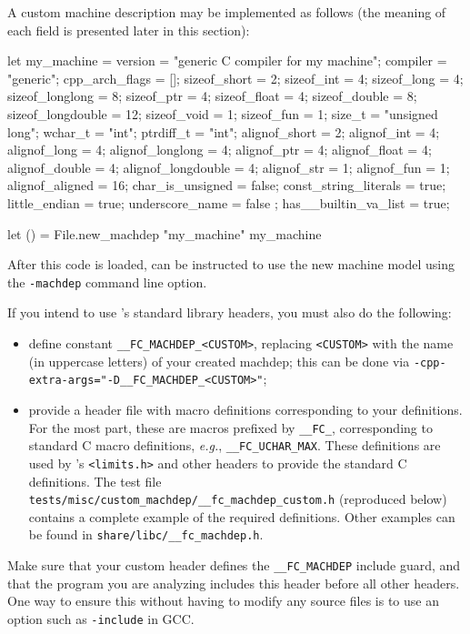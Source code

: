 \begin{example}
  A custom machine description may be implemented as follows
  (the meaning of each field is presented later in this section):
\begin{ocamlcode}
let my_machine =
{
  version          = "generic C compiler for my machine";
  compiler         = "generic";
  cpp_arch_flags   = [];
  sizeof_short     = 2;
  sizeof_int       = 4;
  sizeof_long      = 4;
  sizeof_longlong  = 8;
  sizeof_ptr       = 4;
  sizeof_float     = 4;
  sizeof_double    = 8;
  sizeof_longdouble  = 12;
  sizeof_void      = 1;
  sizeof_fun       = 1;
  size_t = "unsigned long";
  wchar_t = "int";
  ptrdiff_t = "int";
  alignof_short = 2;
  alignof_int = 4;
  alignof_long = 4;
  alignof_longlong = 4;
  alignof_ptr = 4;
  alignof_float = 4;
  alignof_double = 4;
  alignof_longdouble = 4;
  alignof_str = 1;
  alignof_fun = 1;
  alignof_aligned = 16;
  char_is_unsigned = false;
  const_string_literals = true;
  little_endian = true;
  underscore_name = false ;
  has__builtin_va_list = true;
}

let () = File.new_machdep "my_machine" my_machine
\end{ocamlcode}
\end{example}

%
After this code is loaded, \framac can be instructed to use the new machine
model using the \texttt{-machdep} command line option.

If you intend to use \framac's standard library headers, you must also do the
following:

\begin{itemize}
\item define constant \verb+__FC_MACHDEP_<CUSTOM>+, replacing \verb+<CUSTOM>+
  with the name (in uppercase letters) of your created machdep;
  this can be done via \verb+-cpp-extra-args="-D__FC_MACHDEP_<CUSTOM>"+;
\item provide a header file with macro definitions corresponding to your \caml
  definitions. For the most part, these are macros prefixed by \verb+__FC_+,
  corresponding to standard C macro definitions, {\it e.g.},
  \verb+__FC_UCHAR_MAX+. These definitions are used by \framac's
  \verb+<limits.h>+ and other headers to provide the standard C definitions.
  The test file \verb+tests/misc/custom_machdep/__fc_machdep_custom.h+
  (reproduced below)
  contains a complete example of the required definitions. Other examples can
  be found in \verb+share/libc/__fc_machdep.h+.
\end{itemize}
Make sure that your custom header defines the \verb+__FC_MACHDEP+
include guard, and that the program you are analyzing includes this header
before all other headers. One way to ensure this without having to modify any
source files is to use an option such as \verb+-include+ in GCC.

